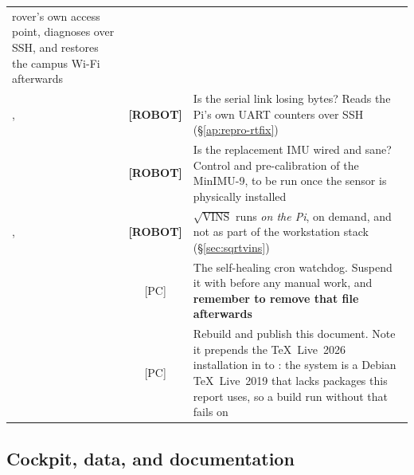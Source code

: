 \begin{longtable}{@{}L{4.8cm}cL{7.2cm}@{}}
  rover's own access point, diagnoses over SSH, and restores the campus
  Wi-Fi afterwards \\
\addlinespace
{}, \newline {}
  & \textbf{[ROBOT]} &
  Is the serial link losing bytes? Reads the Pi's own UART counters over SSH
  (\S\ref{ap:repro-rtfix}) \\
\addlinespace
{} & \textbf{[ROBOT]} &
  Is the replacement IMU wired and sane? Control and pre-calibration of the
  MinIMU-9, to be run once the sensor is physically installed \\
\addlinespace
{}, \newline {}
  & \textbf{[ROBOT]} &
  $\sqrt{\text{VINS}}$ runs \emph{on the Pi}, on demand, and not as part of
  the workstation stack (\S\ref{sec:sqrtvins}) \\
\addlinespace
{} & [PC] &
  The self-healing cron watchdog. Suspend it with
   before any manual work, and
  \textbf{remember to remove that file afterwards} \\
\addlinespace
{} & [PC] &
  Rebuild and publish this document. Note it prepends the TeX~Live~2026
  installation in  to : the
  system  is a Debian TeX~Live~2019 that lacks packages this
  report uses, so a build run without that  fails on
   \\
\bottomrule
\end{longtable}

\subsection{Cockpit, data, and documentation}
\label{ap:repro-inv-web}

